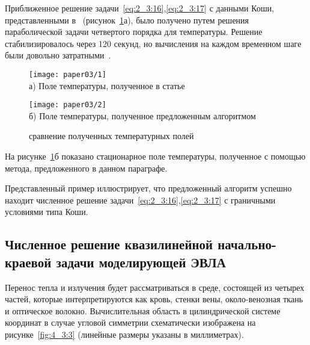 Приближенное решение задачи~\eqref{eq:2_3:16},\eqref{eq:2_3:17}
с данными Коши, представленными в~\cite{Chebotarev2019Problem}
(рисунок~\ref{fig:4_3:1}а), было получено путем решения параболической задачи
четвертого порядка для температуры.
Решение стабилизировалось через 120 секунд, но
вычисления на каждом временном шаге были
довольно затратными~\cite{Chebotarev2019Problem}.
\begin{figure}[h!t]
    \begin{minipage}[b][][b]{0.49\linewidth}
        \centering
        \texttt{[image: paper03/1]} \\ а) Поле температуры,
        полученное в статье~\cite{Chebotarev2019Problem}
    \end{minipage}
    \hfill
    \begin{minipage}[b][][b]{0.49\linewidth}
        \centering
        \texttt{[image: paper03/2]} \\
        б) Поле температуры, полученное предложенным алгоритмом
    \end{minipage}
    \caption{сравнение полученных температурных полей}
    \label{fig:4_3:1}
\end{figure}
На рисунке~\ref{fig:4_3:1}б показано стационарное поле температуры,
полученное с помощью метода, предложенного в данном параграфе.

Представленный пример иллюстрирует, что предложенный
алгоритм успешно находит численное решение
задачи~\eqref{eq:2_3:16},\eqref{eq:2_3:17} с граничными
условиями типа Коши.



\subsection{Численное решение квазилинейной начально-краевой задачи моделирующей ЭВЛА}
\label{subsec:ch4/sec3/quasilinear}
Перенос тепла и излучения будет рассматриваться в среде,
состоящей из четырех частей, которые интерпретируются как кровь,
стенки вены, около-венозная ткань и оптическое волокно.
Вычислительная область в цилиндрической системе координат в случае
угловой симметрии схематически изображена на рисунке~\ref{fig:4_3:3}
(линейные размеры указаны в миллиметрах).

